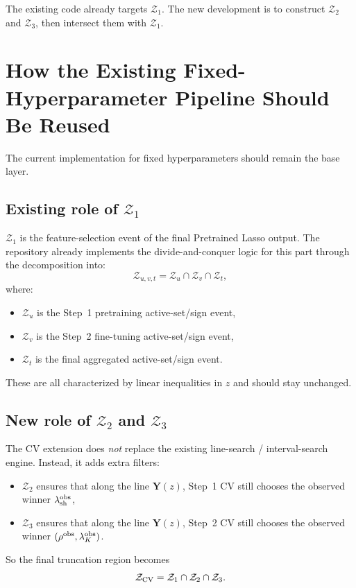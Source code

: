 \documentclass[11pt]{article}
\begin{document}
The existing code already targets $\mathcal{Z}_1$. The new development is to construct $\mathcal{Z}_2$ and $\mathcal{Z}_3$, then intersect them with $\mathcal{Z}_1$.

\section{How the Existing Fixed-Hyperparameter Pipeline Should Be Reused}
The current implementation for fixed hyperparameters should remain the base layer.

\subsection*{Existing role of $\mathcal{Z}_1$}
$\mathcal{Z}_1$ is the feature-selection event of the final Pretrained Lasso output. The repository already implements the divide-and-conquer logic for this part through the decomposition into:
\[
\mathcal{Z}_{u,v,t} = \mathcal{Z}_u \cap \mathcal{Z}_v \cap \mathcal{Z}_t,
\]
where:
\begin{itemize}[leftmargin=2em]
    \item $\mathcal{Z}_u$ is the Step~1 pretraining active-set/sign event,
    \item $\mathcal{Z}_v$ is the Step~2 fine-tuning active-set/sign event,
    \item $\mathcal{Z}_t$ is the final aggregated active-set/sign event.
\end{itemize}

These are all characterized by linear inequalities in $z$ and should stay unchanged.

\subsection*{New role of $\mathcal{Z}_2$ and $\mathcal{Z}_3$}
The CV extension does \emph{not} replace the existing line-search / interval-search engine. Instead, it adds extra filters:
\begin{itemize}[leftmargin=2em]
    \item $\mathcal{Z}_2$ ensures that along the line $\bm{Y}(z)$, Step~1 CV still chooses the observed winner $\lambda_{\rm sh}^{\rm obs}$,
    \item $\mathcal{Z}_3$ ensures that along the line $\bm{Y}(z)$, Step~2 CV still chooses the observed winner $(\rho^{\rm obs}, \lambda_K^{\rm obs})$.
\end{itemize}

So the final truncation region becomes
\[
\mathcal{Z}_{\rm CV} = \mathcal{Z}_1 \cap \mathcal{Z}_2 \cap \mathcal{Z}_3.
\]
\end{document}
